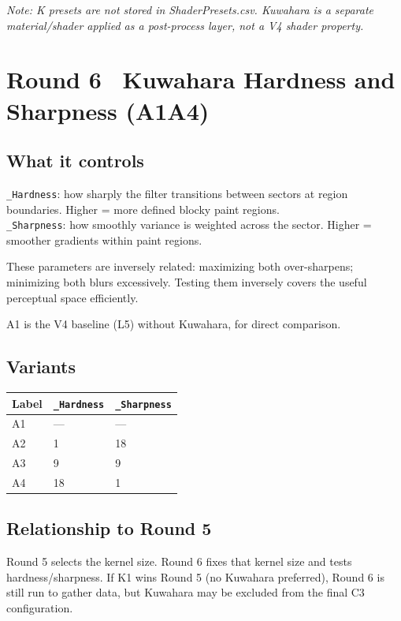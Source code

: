 \documentclass[11pt,a4paper]{article}
\newcommand{\prop}[1]{\texttt{#1}}
\newcommand{\note}[1]{{\small\color{notegray}\textit{Note: #1}}}
\begin{document}
\note{K presets are not stored in ShaderPresets.csv. Kuwahara is a separate material/shader applied as a post-process layer, not a V4 shader property.}

\bigskip

\section*{Round 6 \textemdash\ Kuwahara Hardness and Sharpness (A1\textendash A4)}

\subsection*{What it controls}
\prop{\_Hardness}: how sharply the filter transitions between sectors at region boundaries. Higher = more defined blocky paint regions.\\
\prop{\_Sharpness}: how smoothly variance is weighted across the sector. Higher = smoother gradients within paint regions.

These parameters are inversely related: maximizing both over-sharpens; minimizing both blurs excessively. Testing them inversely covers the useful perceptual space efficiently.

A1 is the V4 baseline (L5) without Kuwahara, for direct comparison.

\subsection*{Variants}

\begin{tabular}{lll}
\toprule
\textbf{Label} & \prop{\_Hardness} & \prop{\_Sharpness} \\
\midrule
A1 & --- & --- \\
A2 & 1   & 18  \\
A3 & 9   & 9   \\
A4 & 18  & 1   \\
\bottomrule
\end{tabular}

\subsection*{Relationship to Round 5}
Round 5 selects the kernel size. Round 6 fixes that kernel size and tests hardness/sharpness. If K1 wins Round 5 (no Kuwahara preferred), Round 6 is still run to gather data, but Kuwahara may be excluded from the final C3 configuration.
\end{document}
